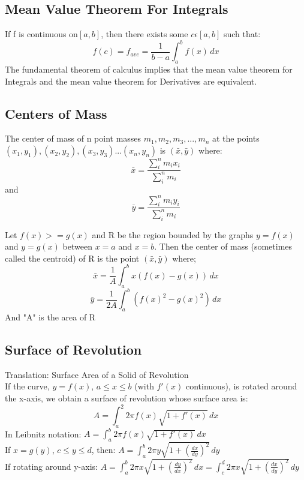 \documentclass[12pt, letterpaper]{article}
\begin{document}
    \subsection*{Mean Value Theorem For Integrals}
        If f is continuous on$[a, b]$, then there exists some $c \epsilon [a, b]$ such that:
            \begin{equation*}
                f(c) = f_{ave} = \frac{1}{b-a} \int^b_a f(x) \,dx
            \end{equation*}
        The fundamental theorem of calculus implies that the mean value theorem for Integrals and the mean value theorem for Derivatives are equivalent. 

    \subsection*{Centers of Mass}
        The center of mass of n point masses $m_1, m_2, m_3, ..., m_n$ at the points $(x_1, y_1), (x_2, y_2), (x_3, y_3)...(x_n, y_n)$ is $(\bar{x}, \bar{y})$  where:
            \begin{equation*}
                \bar{x} = \frac{\sum_{i}^{n}m_i x_i}{\sum_{i}^{n}m_i}
            \end{equation*}
        and
            \begin{equation*}
                \bar{y} = \frac{\sum^n_i m_i y_i}{\sum^n_i m_i}
            \end{equation*}

        Let $f(x) >= g(x)$ and R be the region bounded by the graphs $y = f(x)$ and $y = g(x)$ between $x = a$ and $x = b$. Then the center of mass (sometimes called the centroid) of R is the point $(\bar{x}, \bar{y})$ where;
            \begin{equation*}
                \bar{x} = \frac{1}{A} \int^b_a x(f(x) - g(x)) \,dx
            \end{equation*}
            \begin{equation*}
                \bar{y} = \frac{1}{2A} \int^b_a (f(x)^2 - g(x)^2) \,dx
            \end{equation*}
        And "A" is the area of R

    \subsection*{Surface of Revolution}
        
        Translation: Surface Area of a Solid of Revolution\\
        If the curve, $y = f(x)$, $a \leq x \leq b$ (with $f'(x)$ continuous), is rotated around the x-axis, we obtain a surface of revolution whose surface area is:
        \begin{equation}
            A = \int_{a}^{2} 2 \pi f(x) \sqrt{1 + f'(x)} \,dx
        \end{equation}
        In Leibnitz notation: $A = \int_a^b 2\pi f(x) \sqrt{1 + f'(x)} \,dx$ \\
        If $x = g(y)$, $c \leq y \leq d$, then: $A = \int_a^b 2 \pi y \sqrt{1 + (\frac{dx}{dy})^2} \,dy$ \\
        If rotating around y-axis: $A = \int_a^b 2\pi x \sqrt{1 + (\frac{dy}{dx})^2} \,dx = \int_c^d 2\pi x \sqrt{1 + (\frac{dx}{dy})^2} \,dy$
\end{document}
